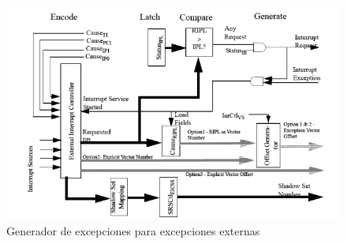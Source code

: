 \begin{figure}[h]
    \centering
    \includegraphics[width=\textwidth]{images/mips/mips-exception-generator}
    \caption{Generador de excepciones para excepciones externas}
    \label{fig:mips-exception-generator}
\end{figure}